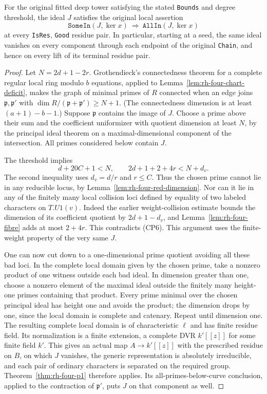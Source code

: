 \begin{theorem}
\label{thm:rh-four-component-chain}
For the original fitted deep tower satisfying the stated
\texttt{Bounds} and degree threshold, the ideal $J$
satisfies the original local assertion
\[
 \texttt{SomeIn}(J,\ker x)\ \Longrightarrow\
 \texttt{AllIn}(J,\ker x)
\]
at every \texttt{IsRes}, \texttt{Good} residue pair.
In particular, starting at a seed, the same ideal
vanishes on every component through each endpoint
of the original \texttt{Chain}, and hence on
every lift of its terminal residue pair.
\end{theorem}
\begin{proof}
Let $N=2d+1-2r$. Grothendieck's connectedness theorem
for a complete regular local ring modulo $b$ equations,
applied to Lemma~\ref{lem:rh-four-chart-deficit}, makes
the graph of minimal primes of $R$ connected when
an edge joins $\mathfrak p,\mathfrak p'$ with
$\dim R/(\mathfrak p+\mathfrak p')\geq N+1$.
(The connectedness dimension is at least
$(a+1)-b-1$.) Suppose $\mathfrak p$ contains the
image of $J$. Choose a prime above their sum and
the coefficient uniformizer with quotient dimension
at least $N$, by the principal ideal theorem on
a maximal-dimensional component of the intersection.
All primes considered below contain $J$.

The threshold implies
\[
 d+20C+1<N,\qquad
 2d+1+2+4r<N+d_v.                                  \tag{CP6}
\]
The second inequality uses $d_v=d/r$ and $r\leq C$.
Thus the chosen prime cannot lie in any reducible
locus, by Lemma~\ref{lem:rh-four-red-dimension}.
Nor can it lie in any of the finitely many local
collision loci defined by equality of two labeled
characters on $T.U1(v)$. Indeed the earlier
weight-collision estimate bounds the dimension of
its coefficient quotient by $2d+1-d_v$, and
Lemma~\ref{lem:rh-four-fibre} adds at most $2+4r$.
This contradicts (CP6). This argument uses the
finite-weight property of the very same $J$.

One can now cut down to a one-dimensional prime
quotient avoiding all these bad loci. In the
complete local domain given by the chosen prime,
take a nonzero product of one witness outside
each bad ideal. In dimension greater than one,
choose a nonzero element of the maximal ideal
outside the finitely many height-one primes
containing that product. Every prime minimal
over the chosen principal ideal has height one
and avoids the product; the dimension drops by
one, since the local domain is complete and
catenary. Repeat until dimension one. The resulting
complete local domain is of characteristic $\ell$
and has finite residue field. Its normalization
is a finite extension, a complete DVR
$k'[[z]]$ for some finite field $k'$. This gives
an actual map $A\to k'[[z]]$ with the prescribed
residue on $B$, on which $J$ vanishes, the generic
representation is absolutely irreducible, and
each pair of ordinary characters is separated
on the required group. Theorem~\ref{thm:rh-four-p1}
therefore applies. Its all-primes-below-curve
conclusion, applied to the contraction of
$\mathfrak p'$, puts $J$ on that component as
well.


\end{proof}
